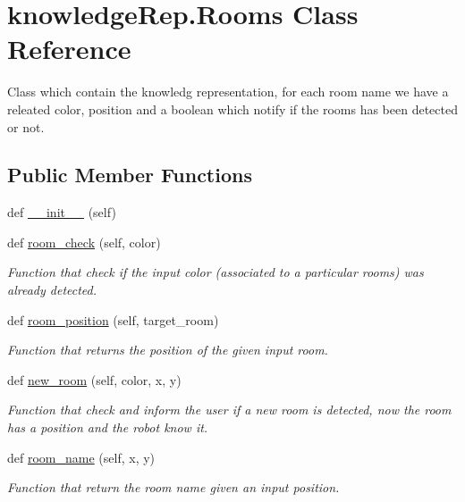 \hypertarget{classknowledgeRep_1_1Rooms}{}\section{knowledge\+Rep.\+Rooms Class Reference}
\label{classknowledgeRep_1_1Rooms}


Class which contain the knowledg representation, for each room name we have a releated color, position and a boolean which notify if the rooms has been detected or not.  


\subsection*{Public Member Functions}
\begin{DoxyCompactItemize}
\item 
def \hyperlink{classknowledgeRep_1_1Rooms_a8b37414da9d2cc9ee820ec306c0b03bf}{\+\_\+\+\_\+init\+\_\+\+\_\+} (self)
\item 
def \hyperlink{classknowledgeRep_1_1Rooms_a834289a5ae57e48cf90087e7f68faba2}{room\+\_\+check} (self, color)
\begin{DoxyCompactList}\small\item\em Function that check if the input color (associated to a particular rooms) was already detected. \end{DoxyCompactList}\item 
def \hyperlink{classknowledgeRep_1_1Rooms_a072ab03a9621d2abd8067817a0583547}{room\+\_\+position} (self, target\+\_\+room)
\begin{DoxyCompactList}\small\item\em Function that returns the position of the given input room. \end{DoxyCompactList}\item 
def \hyperlink{classknowledgeRep_1_1Rooms_a4bdc60738dc11ec176223fe4fb046b2f}{new\+\_\+room} (self, color, x, y)
\begin{DoxyCompactList}\small\item\em Function that check and inform the user if a new room is detected, now the room has a position and the robot know it. \end{DoxyCompactList}\item 
def \hyperlink{classknowledgeRep_1_1Rooms_aaa1ca874182c72929cdd69f5d801ca2e}{room\+\_\+name} (self, x, y)
\begin{DoxyCompactList}\small\item\em Function that return the room name given an input position. \end{DoxyCompactList}\item 

\end{DoxyCompactItemize}
